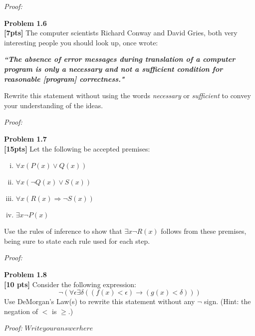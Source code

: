 \documentclass{article}
\newenvironment{problem}[2][Problem]
    { \begin{mdframed}[backgroundcolor=gray!20] \textbf{#1 #2} \\}
    {  \end{mdframed}}
\newenvironment{solution}
    {\textit{Proof:}}
    {}
\begin{document}
\begin{solution}
\end{solution}
\newpage %

\begin{problem}{1.6}
\textbf{[7pts]} The computer scientists Richard Conway and David Gries, both very interesting people you should look up, once wrote: 

\textit{\textbf{``The absence of error messages during translation of a computer program is only a necessary and not a sufficient condition for reasonable [program] correctness."}}

Rewrite this statement without using the words \textit{necessary} or \textit{sufficient} to convey your understanding of the ideas.
\end{problem}
\begin{solution}
\end{solution}
\vspace{2in} %

\begin{problem}{1.7}
\textbf{[15pts]} Let the following be accepted premises:
\begin{enumerate}[i.]
\item $\forall x (P(x) \lor Q(x))$
\item $\forall x (\neg Q(x) \lor S(x))$
\item $\forall x(R(x) \Rightarrow \neg S(x))$
\item $\exists x \neg P(x)$
\end{enumerate}
Use the rules of inference to show that $\exists x \neg R(x)$ follows from these premises, being sure to state each rule used for each step. 
\end{problem}

\begin{solution}
\end{solution}
\newpage %


\begin{problem}{1.8}
\textbf{[10 pts]} Consider the following expression:
$$ \neg(\forall\epsilon\exists\delta((f(x)<\epsilon)\rightarrow(g(x)<\delta))) $$
Use DeMorgan's Law(s) to rewrite this statement without any $\neg$ sign. (Hint: the negation of $<$ is $\geq$.)
\end{problem}
\begin{solution}
$ Write your answer here$
\end{solution}
\newpage
\end{document}
